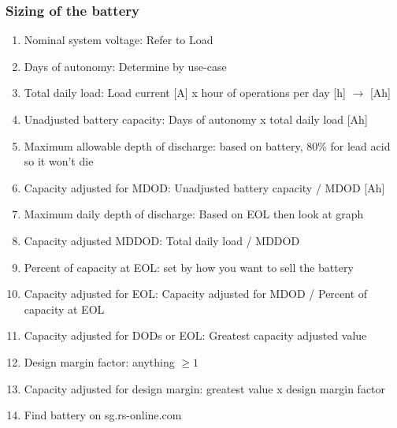 \documentclass{article}
\begin{document}
\subsubsection{Sizing of the battery}
\begin{enumerate}
	\item Nominal system voltage: Refer to Load
	\item Days of autonomy: Determine by use-case
	\item Total daily load: Load current [A] x hour of operations per day [h] $\rightarrow$ [Ah]
	\item Unadjusted battery capacity: Days of autonomy x total daily load [Ah]
	\item Maximum allowable depth of discharge: based on battery, 80\% for lead acid so it won't die
	\item Capacity adjusted for MDOD: Unadjusted battery capacity / MDOD [Ah]
	\item Maximum daily depth of discharge: Based on EOL then look at graph
	\item Capacity adjusted MDDOD: Total daily load / MDDOD
	\item Percent of capacity at EOL: set by how you want to sell the battery
	\item Capacity adjusted for EOL: Capacity adjusted for MDOD / Percent of capacity at EOL
	\item Capacity adjusted for DODs or EOL: Greatest capacity adjusted value
	\item Design margin factor: anything $\geq 1$
	\item Capacity adjusted for design margin: greatest value x design margin factor
	\item Find battery on sg.rs-online.com
\end{enumerate}
\end{document}
